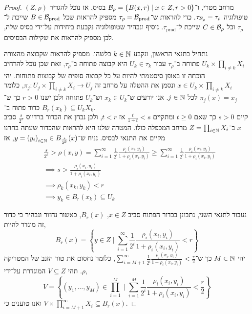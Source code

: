 \begin{proof}
	$(Z, \rho)$ מרחב מטרי, ו־$\mathcal{B}_\rho = \{ B(x, r) \mid x \in Z, r > 0 \}$ בסיס, אז נוכל להגדיר טופולוגיה $\tau_{\mathcal{B}_\rho} = \tau_\rho$.
	כדי להראות ש־$\tau_\rho = \mathcal{B}_{\text{prod}}$ מספיק להראות שכל $B \in \mathcal{B}_\text{prod}$ שייכת ל־$\tau_\rho$ וכל $C \in \mathcal{B}_\rho$ שייכת ל־$\tau_\text{prod}$.
	נוסיף ונבהיר שטופולוגיה נקבעת ביחידות על־ידי בסיס שלה, לכן מספיק להראות את שקילות הבסיסים.

	נתחיל בתנאי הראשון, ונקבע $k \in \mathbb{N}$ כלשהו. מספיק להראות שקבוצה מהצורה $U_k \times \prod_{i \ne k} X_i$ פתוחה ב־$\tau_\rho$ עבור $U_k \in \tau_k$ היא קבוצה פתוחה ב־$\tau_\rho$,
	זאת שכן נוכל להרחיב הוכחה זו באופן סיסטמתי להיות על כל קבוצה סופית של קבוצות פתוחות.
	יהי $x \in U_k \times \prod_{i \ne k} X_i$ ונסמן את ההטלה על מרחב זה $\pi_j : U_j \times \prod_{i \ne k} X_i \to U_j$, כלומר $\pi_j(x) = x_j$ לכל $j \in \mathbb{N}$.
	אנו יודעים ש־$x_k \in U_k$ וש־$U_k$ פתוחה ולכן ישנו $r > 0$ כך ש־$B_r(x_k) \subseteq U_k$ כדור פתוח ב־$X_k$. \\
	קיים $s > 0$ כך שאם $t \ge 0$ ומתקיים $\frac{t}{1 + t} < s$ אז $t < r$, ולכן נבחן את הכדור ברדיוס $\frac{s}{2^k}$ סביב $x$ ב־$Z = \prod_{i \in \mathbb{N}} X_i$ מרחב המכפלה כולו.
	המטרה שלנו היא להראות שהכדור שעתה בחרנו מקיים את התנאי לבסיס.
	נניח ש־$y = {(y_i)}_{i \in \mathbb{N}} \in B_{\frac{s}{2^k}}(x)$, אז
	\begin{align*}
		& \frac{s}{2^k} > \rho(x, y)
		= \sum_{i = 1}^{\infty} \frac{1}{2^i} \frac{\rho_i(x_i, y_i)}{1 + \rho_i(x_i, y_i)}
		\ge \sum_{i = 1}^{\infty} \frac{1}{2^i} \frac{\rho_i(x_i, y_i)}{1 + \rho_i(x_i, y_i)} \\
		& \implies s > \frac{\rho_i(x_i, y_i)}{1 + \rho_i(x_i, y_i)} \\
		& \implies \rho_k(x_k, y_k) < r \\
		& \implies y_k \in B_r(x_k) \subseteq U_k
	\end{align*}

	נעבור לתנאי השני, נתבונן בכדור הפתוח סביב $x \in Z$, $B_r(x)$, כאשור נחזור ונבהיר כי כדור זה מוגדר להיות,
	\[
		B_r(x)
		= \left\{ y \in Z \mid \sum_{i = 1}^{\infty} \frac{1}{2^i} \frac{\rho_i(x_i, y_i)}{1 + \rho_i(x_i, y_i)} < r \right\}
	\]
	יהי $M \in \mathbb{N}$ כך ש־$\sum_{i = M + 1}^{\infty} \frac{1}{2^i} \frac{\rho_i(x_i, y_i)}{1 + \rho_i(x_i, y_i)} < \frac{r}{2}$, כלומר נחסום את טור הזנב של המטריקה $\rho$.
	תהי $V \subseteq Z$ המוגדרת על־ידי,
	\[
		V
		= \left\{ (y_1, \dots, y_M) \in \prod_{i = 1}^M \mid \sum_{i = 1}^M \frac{1}{2^i} \frac{\rho_i(x_i, y_i)}{1 + \rho_i(x_i, y_i)} < \frac{r}{2} \right\}
	\]
	ואנו טוענים כי $V \times \prod_{i = M + 1}^\infty X_i \subseteq B_r(x)$.
\end{proof}


